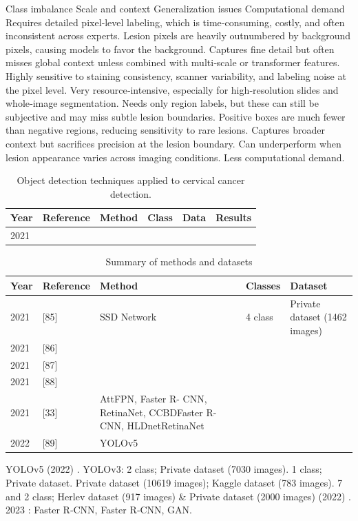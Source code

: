 \documentclass[final,5p,times,twocolumn,authoryear]{elsarticle}
\begin{document}
Class imbalance
Scale and context
Generalization
issues
Computational
demand
Requires detailed pixel‑level labeling, which is time‑consuming, costly, and often inconsistent across experts. Lesion pixels are heavily outnumbered by background pixels, causing models to favor the background. Captures fine detail but often misses global context unless combined with multi‑scale or transformer features. Highly sensitive to staining consistency, scanner variability, and labeling noise at the pixel level. Very resource‑intensive, especially for high‑resolution slides and whole‑image segmentation.
Needs only region labels, but these can still be subjective and may miss subtle lesion boundaries. Positive boxes are much fewer than negative regions, reducing sensitivity to rare lesions. Captures broader context but sacrifices precision at the lesion boundary.
Can underperform when lesion appearance varies across imaging conditions.
Less computational demand.
\begin{table}
\centering
\caption{Object detection techniques applied to cervical cancer detection.}
\label{tab:objdet}
\begin{tabular}{llllll}
\hline
Year & Reference & Method & Class & Data & Results \\
\hline
2021 & & & & & \\
\hline
\end{tabular}
\end{table}

\begin{table}
\centering
\caption{Summary of methods and datasets}
\label{tab:summary}
\begin{tabular}{lllll}
\hline
Year & Reference & Method & Classes & Dataset \\
\hline
2021 & [85] & SSD Network & 4 class & Private dataset (1462 images) \\
2021 & [86] & & & \\
2021 & [87] & & & \\
2021 & [88] & & & \\
2021 & [33] & AttFPN, Faster R- CNN, RetinaNet, CCBDFaster R- CNN, HLDnetRetinaNet & & \\
2022 & [89] & YOLOv5 & & \\
\hline
\end{tabular}
\end{table}

YOLOv5 (2022) \cite{ref83}.
YOLOv3: 2 class; Private dataset (7030 images).
1 class; Private dataset.
Private dataset (10619 images); Kaggle dataset (783 images).
7 and 2 class; Herlev dataset (917 images) \& Private dataset (2000 images) (2022) \cite{ref84}.
2023 \cite{ref90}: Faster R‑CNN, Faster R‑CNN, GAN.
\end{document}
